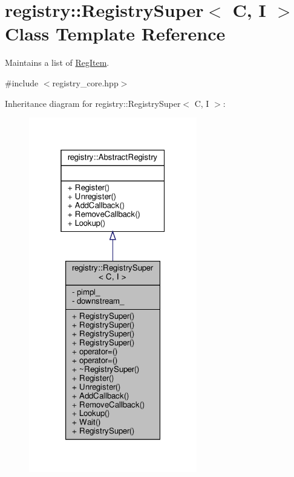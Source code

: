 \hypertarget{classregistry_1_1RegistrySuper}{}\section{registry\+:\+:Registry\+Super$<$ C, I $>$ Class Template Reference}
\label{classregistry_1_1RegistrySuper}


Maintains a list of \hyperlink{classregistry_1_1RegItem}{Reg\+Item}.  




{\ttfamily \#include $<$registry\+\_\+core.\+hpp$>$}



Inheritance diagram for registry\+:\+:Registry\+Super$<$ C, I $>$\+:
\nopagebreak
\begin{figure}[H]
\begin{center}
\leavevmode
\includegraphics[width=208pt]{classregistry_1_1RegistrySuper__inherit__graph}
\end{center}
\end{figure}


